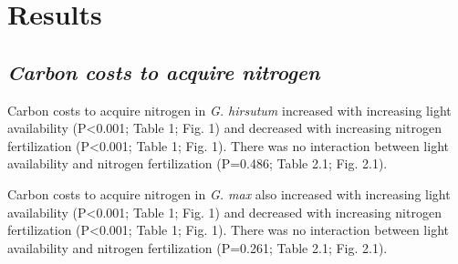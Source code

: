 \section{Results}
\subsection{\textit{Carbon costs to acquire nitrogen}}
Carbon costs to acquire nitrogen in \textit{G. hirsutum} increased with increasing light availability (P<0.001; Table 1; Fig. 1) and decreased with increasing nitrogen fertilization (P<0.001; Table 1; Fig. 1). There was no interaction between light availability and nitrogen fertilization (P=0.486; Table 2.1; Fig. 2.1).

Carbon costs to acquire nitrogen in \textit{G. max} also increased with increasing light availability (P<0.001; Table 1; Fig. 1) and decreased with increasing nitrogen fertilization (P<0.001; Table 1; Fig. 1). There was no interaction between light availability and nitrogen fertilization (P=0.261; Table 2.1; Fig. 2.1).

